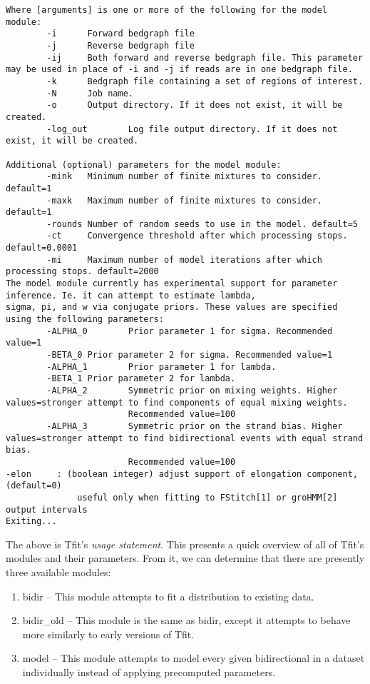 \documentclass[12pt,letterpaper]{article}
\begin{document}
\begin{lstlisting}
Where [arguments] is one or more of the following for the model module:
        -i      Forward bedgraph file
        -j      Reverse bedgraph file
        -ij     Both forward and reverse bedgraph file. This parameter may be used in place of -i and -j if reads are in one bedgraph file.
        -k      Bedgraph file containing a set of regions of interest.
        -N      Job name.
        -o      Output directory. If it does not exist, it will be created.
        -log_out        Log file output directory. If it does not exist, it will be created.

Additional (optional) parameters for the model module:
        -mink   Minimum number of finite mixtures to consider. default=1
        -maxk   Maximum number of finite mixtures to consider. default=1
        -rounds Number of random seeds to use in the model. default=5
        -ct     Convergence threshold after which processing stops. default=0.0001
        -mi     Maximum number of model iterations after which processing stops. default=2000
The model module currently has experimental support for parameter inference. Ie. it can attempt to estimate lambda,
sigma, pi, and w via conjugate priors. These values are specified using the following parameters:
        -ALPHA_0        Prior parameter 1 for sigma. Recommended value=1
        -BETA_0 Prior parameter 2 for sigma. Recommended value=1
        -ALPHA_1        Prior parameter 1 for lambda.
        -BETA_1 Prior parameter 2 for lambda.
        -ALPHA_2        Symmetric prior on mixing weights. Higher values=stronger attempt to find components of equal mixing weights.
                        Recommended value=100
        -ALPHA_3        Symmetric prior on the strand bias. Higher values=stronger attempt to find bidirectional events with equal strand bias.
                        Recommended value=100
-elon     : (boolean integer) adjust support of elongation component, (default=0)
              useful only when fitting to FStitch[1] or groHMM[2] output intervals
Exiting...
\end{lstlisting}

The above is Tfit's \textit{usage statement}. This presents a quick overview of all of Tfit's modules and their parameters. From it, we can determine that there are presently three available modules:
\begin{enumerate}
\item bidir -- This module attempts to fit a distribution to existing data.
\item bidir\_old -- This module is the same as bidir, except it attempts to behave more similarly to early versions of Tfit.
\item model -- This module attempts to model every given bidirectional in a dataset individually instead of applying precomputed parameters.
\end{enumerate}
\end{document}
